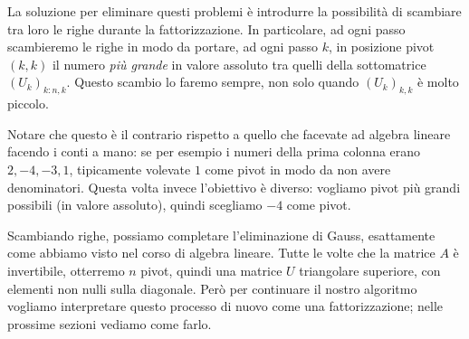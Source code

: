 \documentclass[a4paper]{report}
\theoremstyle{definiton}
\theoremstyle{remark}
\begin{document}
La soluzione per eliminare questi problemi è introdurre la possibilità di scambiare tra loro le righe durante la fattorizzazione. In particolare, ad ogni passo scambieremo le righe in modo da portare, ad ogni passo $k$, in posizione pivot $(k,k)$ il numero \emph{più grande} in valore assoluto tra quelli della sottomatrice $(U_k)_{k:n,k}$. Questo scambio lo faremo sempre, non solo quando $(U_k)_{k,k}$ è molto piccolo.

Notare che questo è il contrario rispetto a quello che facevate ad algebra lineare facendo i conti a mano: se per esempio i numeri della prima colonna erano $2,-4,-3,1$, tipicamente volevate $1$ come pivot in modo da non avere denominatori. Questa volta invece l'obiettivo è diverso: vogliamo pivot più grandi possibili (in valore assoluto), quindi scegliamo $-4$ come pivot.

Scambiando righe, possiamo completare l'eliminazione di Gauss, esattamente come abbiamo visto nel corso di algebra lineare. Tutte le volte che la matrice $A$ è invertibile, otterremo $n$ pivot, quindi una matrice $U$ triangolare superiore, con elementi non nulli sulla diagonale. Però per continuare il nostro algoritmo vogliamo interpretare questo processo di nuovo come una fattorizzazione; nelle prossime sezioni vediamo come farlo.
\end{document}
